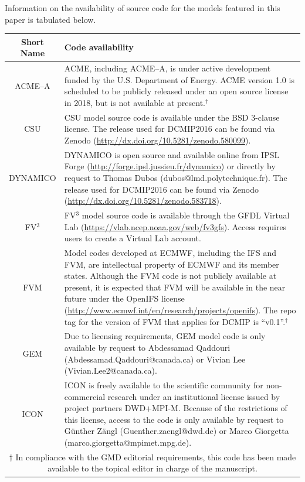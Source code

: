\documentclass[gmd, manuscript]{copernicus}
\begin{document}
Information on the availability of source code for the models featured in this paper is tabulated below.

\begin{center}
\begin{tabular}{cp{5in}}
\hline Short Name & Code availability \\ \hline 
ACME--A & ACME, including ACME--A, is under active development funded by the U.S. Department of Energy.  ACME version 1.0 is scheduled to be publicly released under an open source license in 2018, but is not available at present.$^\dagger$ \\
CSU & CSU model source code is available under the BSD 3-clause license.  The release used for DCMIP2016 can be found via Zenodo (\mbox{\url{http://dx.doi.org/10.5281/zenodo.580099}}). \\
DYNAMICO & DYNAMICO is open source and available online from IPSL Forge (\mbox{\url{http://forge.ipsl.jussieu.fr/dynamico}}) or directly by request to Thomas Dubos (\mbox{dubos@lmd.polytechnique.fr}).  The release used for DCMIP2016 can be found via Zenodo (\mbox{\url{http://dx.doi.org/10.5281/zenodo.583718}}). \\
FV$^3$ & FV$^3$ model source code is available through the GFDL Virtual Lab (\url{https://vlab.ncep.noaa.gov/web/fv3gfs}).  Access requires users to create a Virtual Lab account. \\
FVM & Model codes developed at ECMWF, including the IFS and FVM, are intellectual 
property of ECMWF and its member states.  Although the FVM code is not publicly available at present, it is expected that FVM will be available in the near future under the OpenIFS license (\url{http://www.ecmwf.int/en/research/projects/openifs}).  The repo tag for the version of FVM that applies for DCMIP is ``v0.1''.$^\dagger$ \\
GEM & Due to licensing requirements, GEM model code is only available by request to Abdessamad Qaddouri (Abdessamad.Qaddouri@canada.ca) or Vivian Lee (Vivian.Lee2@canada.ca). \\
ICON & ICON is freely available to the scientific community for non-commercial research under an institutional license issued by project partners DWD+MPI-M.  Because of the restrictions of this license, access to the code is only available by request to G\"unther Z\"{a}ngl (\mbox{Guenther.zaengl@dwd.de}) or Marco Giorgetta (\mbox{marco.giorgetta@mpimet.mpg.de}). \\
\hline \multicolumn{2}{p{6in}}{$\dagger$ \footnotesize In compliance with the GMD editorial requirements, this code has been made available to the topical editor in charge of the manuscript.}
\end{tabular}
\end{center}
\end{document}
